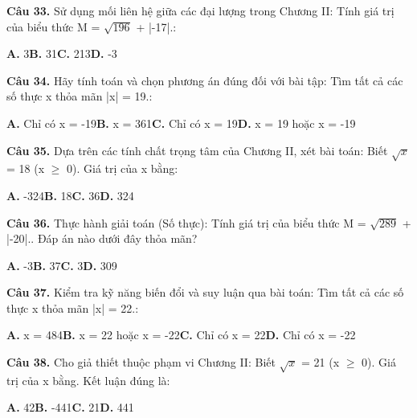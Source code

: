 \documentclass[11pt,a4paper]{article}
\begin{document}
\textbf{\color{primary} Câu 33.} Sử dụng mối liên hệ giữa các đại lượng trong Chương II: Tính giá trị của biểu thức M = $\sqrt{196}$ + |-17|.:\par
\hspace*{1.5em}\textbf{A.} 3\quad\quad \textbf{B.} 31\quad\quad \textbf{C.} 213\quad\quad \textbf{D.} -3\par\vspace{2pt}
\textbf{\color{primary} Câu 34.} Hãy tính toán và chọn phương án đúng đối với bài tập: Tìm tất cả các số thực x thỏa mãn |x| = 19.:\par
\hspace*{1.5em}\textbf{A.} Chỉ có x = -19\quad\quad \textbf{B.} x = 361\quad\quad \textbf{C.} Chỉ có x = 19\quad\quad \textbf{D.} x = 19 hoặc x = -19\par\vspace{2pt}
\textbf{\color{primary} Câu 35.} Dựa trên các tính chất trọng tâm của Chương II, xét bài toán: Biết $\sqrt{x}$ = 18 (x $\ge$ 0). Giá trị của x bằng:\par
\hspace*{1.5em}\textbf{A.} -324\quad\quad \textbf{B.} 18\quad\quad \textbf{C.} 36\quad\quad \textbf{D.} 324\par\vspace{2pt}
\textbf{\color{primary} Câu 36.} Thực hành giải toán (Số thực): Tính giá trị của biểu thức M = $\sqrt{289}$ + |-20|.. Đáp án nào dưới đây thỏa mãn?\par
\hspace*{1.5em}\textbf{A.} -3\quad\quad \textbf{B.} 37\quad\quad \textbf{C.} 3\quad\quad \textbf{D.} 309\par\vspace{2pt}
\textbf{\color{primary} Câu 37.} Kiểm tra kỹ năng biến đổi và suy luận qua bài toán: Tìm tất cả các số thực x thỏa mãn |x| = 22.:\par
\hspace*{1.5em}\textbf{A.} x = 484\quad\quad \textbf{B.} x = 22 hoặc x = -22\quad\quad \textbf{C.} Chỉ có x = 22\quad\quad \textbf{D.} Chỉ có x = -22\par\vspace{2pt}
\textbf{\color{primary} Câu 38.} Cho giả thiết thuộc phạm vi Chương II: Biết $\sqrt{x}$ = 21 (x $\ge$ 0). Giá trị của x bằng. Kết luận đúng là:\par
\hspace*{1.5em}\textbf{A.} 42\quad\quad \textbf{B.} -441\quad\quad \textbf{C.} 21\quad\quad \textbf{D.} 441\par\vspace{2pt}
\end{document}

